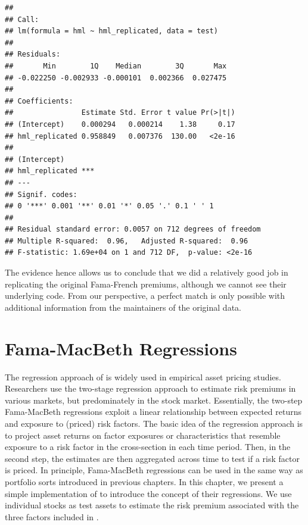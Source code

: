 \documentclass[
]{book}
\begin{document}
\begin{verbatim}
## 
## Call:
## lm(formula = hml ~ hml_replicated, data = test)
## 
## Residuals:
##       Min        1Q    Median        3Q       Max 
## -0.022250 -0.002933 -0.000101  0.002366  0.027475 
## 
## Coefficients:
##                Estimate Std. Error t value Pr(>|t|)
## (Intercept)    0.000294   0.000214    1.38     0.17
## hml_replicated 0.958849   0.007376  130.00   <2e-16
##                   
## (Intercept)       
## hml_replicated ***
## ---
## Signif. codes:  
## 0 '***' 0.001 '**' 0.01 '*' 0.05 '.' 0.1 ' ' 1
## 
## Residual standard error: 0.0057 on 712 degrees of freedom
## Multiple R-squared:  0.96,   Adjusted R-squared:  0.96 
## F-statistic: 1.69e+04 on 1 and 712 DF,  p-value: <2e-16
\end{verbatim}

The evidence hence allows us to conclude that we did a relatively good job in replicating the original Fama-French premiums, although we cannot see their underlying code.
From our perspective, a perfect match is only possible with additional information from the maintainers of the original data.

\hypertarget{fama-macbeth-regressions}{%
\chapter{Fama-MacBeth Regressions}\label{fama-macbeth-regressions}}

The regression approach of \citet{Fama1973} is widely used in empirical asset pricing studies.
Researchers use the two-stage regression approach to estimate risk premiums in various markets, but predominately in the stock market.
Essentially, the two-step Fama-MacBeth regressions exploit a linear relationship between expected returns and exposure to (priced) risk factors.
The basic idea of the regression approach is to project asset returns on factor exposures or characteristics that resemble exposure to a risk factor in the cross-section in each time period.
Then, in the second step, the estimates are then aggregated across time to test if a risk factor is priced.
In principle, Fama-MacBeth regressions can be used in the same way as portfolio sorts introduced in previous chapters.
In this chapter, we present a simple implementation of \citet{Fama1973} to introduce the concept of their regressions. We use individual stocks as test assets to estimate the risk premium associated with the three factors included in \citet{Fama1993}.
\end{document}
